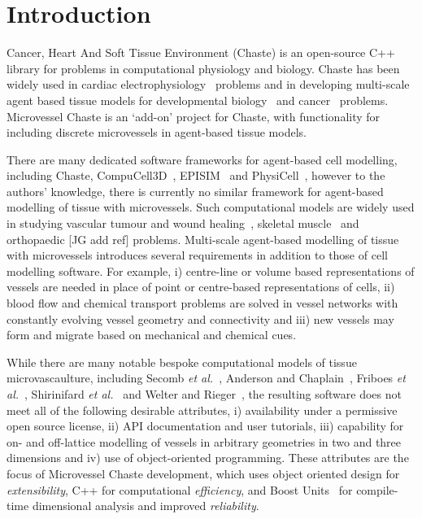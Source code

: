 \documentclass[10pt,letterpaper]{article}
\begin{document}
\linenumbers

\section*{Introduction}
Cancer, Heart And Soft Tissue Environment (Chaste) is an open-source C++ library for problems in computational physiology and biology. Chaste has been widely used in cardiac electrophysiology~\cite{Cooper2015} problems and in developing multi-scale agent based tissue models for developmental biology~\cite{Tetley2016} and cancer~\cite{Dunn2016} problems. Microvessel Chaste is an `add-on' project for Chaste, with functionality for including discrete microvessels in agent-based tissue models.

There are many dedicated software frameworks for agent-based cell modelling, including Chaste, CompuCell3D~\cite{Swat2012}, EPISIM~\cite{Sutterlin2013} and PhysiCell~\cite{Macklin2012}, however to the authors' knowledge, there is currently no similar framework for agent-based modelling of tissue with microvessels. Such computational models are widely used in studying vascular tumour and wound healing~\cite{Owen2011}, skeletal muscle~\cite{Secomb2004} and orthopaedic [JG add ref] problems. Multi-scale agent-based modelling of tissue with microvessels introduces several requirements in addition to those of cell modelling software. For example, i) centre-line or volume based representations of vessels are needed in place of point or centre-based representations of cells, ii) blood flow and chemical transport problems are solved in vessel networks with constantly evolving vessel geometry and connectivity and iii) new vessels may form and migrate based on mechanical and chemical cues. 

While there are many notable bespoke computational models of tissue microvascaulture, including Secomb \emph{et al.}~\cite{Secomb2013}, Anderson and Chaplain~\cite{Anderson1998}, Friboes \emph{et al.}~\cite{Frieboes2007}, Shirinifard \emph{et al.}~\cite{Shirinifard2009} and Welter and Rieger~\cite{Welter2013}, the resulting software does not meet all of the following desirable attributes, i) availability under a permissive open source license, ii) API documentation and user tutorials, iii) capability for on- and off-lattice modelling of vessels in arbitrary geometries in two and three dimensions and iv) use of object-oriented programming. These attributes are the focus of Microvessel Chaste development, which uses object oriented design for \emph{extensibility}, C++ for computational \emph{efficiency}, and Boost Units~\cite{boost161} for compile-time dimensional analysis and improved \emph{reliability}. 
\end{document}
